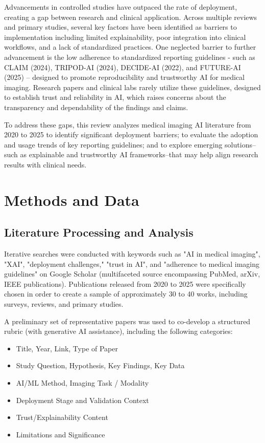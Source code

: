 \documentclass{article}
\begin{document}
Advancements in controlled studies have outpaced the rate of deployment, creating a gap between research and clinical application. Across multiple reviews and primary studies, several key factors have been identified as barriers to implementation including limited explainability, poor integration into clinical workflows, and a lack of standardized practices. One neglected barrier to further advancement is the low adherence to standardized reporting guidelines - such as CLAIM (2024), TRIPOD-AI (2024), DECIDE-AI (2022), and FUTURE-AI (2025) – designed to promote reproducibility and trustworthy AI for medical imaging. Research papers and clinical labs rarely utilize these guidelines, designed to establish trust and reliability in AI, which raises concerns about the transparency and dependability of the findings and claims.

To address these gaps, this review analyzes medical imaging AI literature from 2020 to 2025 to identify significant deployment barriers; to evaluate the adoption and usage trends of key reporting guidelines; and to explore emerging solutions–such as explainable and trustworthy AI frameworks–that may help align research results with clinical needs.

\section{Methods and Data}
\subsection{Literature Processing and Analysis}
Iterative searches were conducted with keywords such as "AI in medical imaging", "XAI", "deployment challenges," "trust in AI", and "adherence to medical imaging guidelines" on Google Scholar (multifaceted source encompassing PubMed, arXiv, IEEE publications). Publications released from 2020 to 2025 were specifically chosen in order to create a sample of approximately 30 to 40 works, including surveys, reviews, and primary studies.

A preliminary set of representative papers was used to co-develop a structured rubric (with generative AI assistance), including the following categories:

\begin{itemize}
\item Title, Year, Link, Type of Paper
\item Study Question, Hypothesis, Key Findings, Key Data
\item AI/ML Method, Imaging Task / Modality
\item Deployment Stage and Validation Context
\item Trust/Explainability Content
\item Limitations and Significance
\end{itemize}
\end{document}
